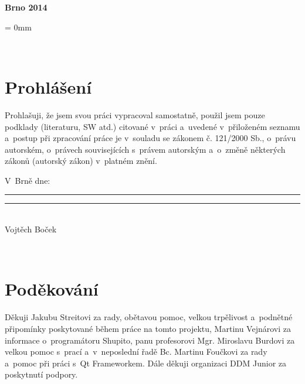\documentclass[12pt, a4paper, oneside]{article}
\newcommand{\B}{\textbf} %
\begin{document}
\vspace{20mm}

\begin{center}
\B{Brno 2014}

\end{center}
\normalsize
\newpage  %
\voffset = 0mm %

~ %

\vspace{10mm}

\section*{Prohlášení}

Prohlašuji, že jsem svou práci vypracoval samostatně, použil jsem pouze podklady (literaturu, SW atd.) citované v~práci a~uvedené v~přiloženém seznamu a~postup při zpracování práce je v~souladu se zákonem č. 121/2000 Sb., o~právu autorském, o~právech souvisejících s~právem autorským a~o~změně některých zákonů (autorský zákon) v~platném znění.

\vspace{10mm}

\noindent \parbox{\textwidth}{
\noindent V~Brně dne: \rule{4cm}{1pt}
\hfill\parbox{5cm}{
    \centering
    \vspace{9mm}
    \rule{5cm}{1pt}\\
        Vojtěch Boček
}
}
 

\newpage   %

~ %
\vspace{100mm}
\section*{Poděkování}
Děkuji Jakubu Streitovi za rady, obětavou pomoc, velkou trpělivost a~podnětné připomínky poskytované během práce na tomto projektu, Martinu Vejnárovi za informace o~programátoru Shupito, panu profesorovi Mgr. Miroslavu Burdovi za velkou pomoc s~prací a~v~neposlední řadě Bc. Martinu Foučkovi za rady a~pomoc při práci s~Qt Frameworkem. Dále děkuji organizaci DDM Junior za poskytnutí podpory.
 

\newpage   %
~ %
\vspace{-20mm}
\end{document}
